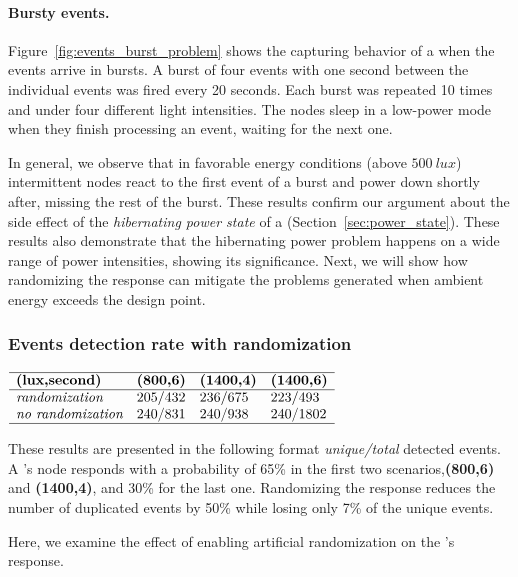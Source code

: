 \paragraph{Bursty events.}
Figure~\ref{fig:events_burst_problem} shows the capturing behavior of a \cis when the events arrive in bursts. A burst of four events with one second between the individual events was fired every 20 seconds. Each burst was repeated 10 times and under four different light intensities. The nodes sleep in a low-power mode when they finish processing an event, waiting for the next one. 

In general, we observe that in favorable energy conditions (above $\SI{500}{lux}$) intermittent nodes react to the first event of a burst and power down shortly after, missing the rest of the burst. These results confirm our argument about the side effect of the \textit{hibernating power state} of a \cis (Section~\ref{sec:power_state}). These results also demonstrate that the hibernating power problem happens on a wide range of power intensities, showing its significance. Next, we will show how randomizing the response can mitigate the problems generated when ambient energy exceeds the design point. 

\subsubsection{Events detection rate with randomization}
\begin{table}
	\centering
    $
    \begin{array}{llll}\hline
     \textbf{(lux,second)} & \textbf{(800,6)} & \textbf{(1400,4)} & \textbf{(1400,6)}\\\hline
    \textit{randomization}    & 205/432 &  236/675 & 223/493 \\
    \textit{no randomization} & 240/831 &  240/938 & 240/1802 \\\hline
    \end{array}
    $
    \caption{These results are presented in the following format \textit{unique/total} detected events. A \cis's node responds with a probability of 65\% in the first two scenarios,\textbf{(800,6)} and \textbf{(1400,4)}, and 30\% for the last one.   
    Randomizing the response reduces the number of duplicated events by 50\% while losing only 7\% of the unique events.}
    \label{tab:regular_rand}
\end{table}
% 
Here, we examine the effect of enabling artificial randomization on the \cis's response. 

